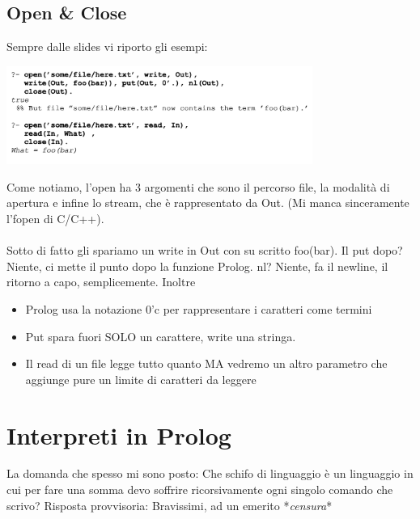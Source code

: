\documentclass[12pt, a4paper, openany, oneside]{book}
\begin{document}
\section{Open \& Close}
Sempre dalle slides vi riporto gli esempi:
\begin{center}
\includegraphics[width=0.75\textwidth]{openclose}
\end{center}
Come notiamo, l'open ha 3 argomenti che sono il percorso file, la modalità di
apertura e infine lo stream, che è rappresentato da Out. (Mi manca sinceramente
l'fopen di C/C++). \\ \\Sotto di fatto gli spariamo un write in Out con su scritto
foo(bar). Il put dopo? Niente, ci mette il punto dopo la funzione Prolog.
nl? Niente, fa il newline, il ritorno a capo, semplicemente. Inoltre
\begin{itemize}
	\item Prolog usa la notazione 0’c per rappresentare i caratteri come termini
	\item Put spara fuori SOLO un carattere, write una stringa.
	\item Il read di un file legge tutto quanto MA vedremo un altro parametro che
	aggiunge pure un limite di caratteri da leggere
\end{itemize}
\chapter{Interpreti in Prolog}
La domanda che spesso mi sono posto: Che schifo di linguaggio è un linguaggio in
cui per fare una somma devo soffrire ricorsivamente ogni singolo comando che 
scrivo? Risposta provvisoria: Bravissimi, ad un emerito *\textit{censura}*
\end{document}

